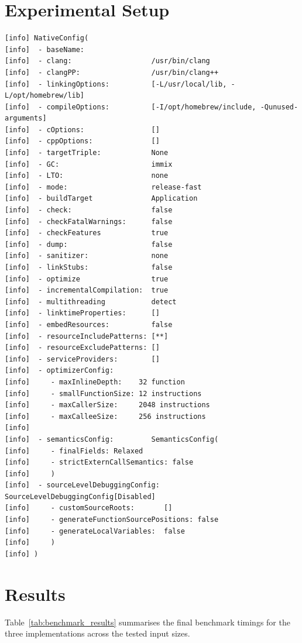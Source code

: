 \documentclass[
  english,   %
  bibtex,    %
]{kththesis}
\begin{document}
\section{Experimental Setup}

\begin{lstlisting}[basicstyle=\ttfamily\small, frame=single, breaklines=true]
[info] NativeConfig(
[info]  - baseName:
[info]  - clang:                   /usr/bin/clang
[info]  - clangPP:                 /usr/bin/clang++
[info]  - linkingOptions:          [-L/usr/local/lib, -L/opt/homebrew/lib]
[info]  - compileOptions:          [-I/opt/homebrew/include, -Qunused-arguments]
[info]  - cOptions:                []
[info]  - cppOptions:              []
[info]  - targetTriple:            None
[info]  - GC:                      immix
[info]  - LTO:                     none
[info]  - mode:                    release-fast
[info]  - buildTarget              Application
[info]  - check:                   false
[info]  - checkFatalWarnings:      false
[info]  - checkFeatures            true
[info]  - dump:                    false
[info]  - sanitizer:               none
[info]  - linkStubs:               false
[info]  - optimize                 true
[info]  - incrementalCompilation:  true
[info]  - multithreading           detect
[info]  - linktimeProperties:      []
[info]  - embedResources:          false
[info]  - resourceIncludePatterns: [**]
[info]  - resourceExcludePatterns: []
[info]  - serviceProviders:        []
[info]  - optimizerConfig:
[info]     - maxInlineDepth:    32 function
[info]     - smallFunctionSize: 12 instructions
[info]     - maxCallerSize:     2048 instructions
[info]     - maxCalleeSize:     256 instructions
[info]
[info]  - semanticsConfig:         SemanticsConfig(
[info]     - finalFields: Relaxed
[info]     - strictExternCallSemantics: false
[info]     )
[info]  - sourceLevelDebuggingConfig: SourceLevelDebuggingConfig[Disabled]
[info]     - customSourceRoots:       []
[info]     - generateFunctionSourcePositions: false
[info]     - generateLocalVariables:  false
[info]     )
[info] )
\end{lstlisting}

\section{Results}

Table~\ref{tab:benchmark_results} summarises the final benchmark timings for
the three implementations across the tested input sizes.
\end{document}
